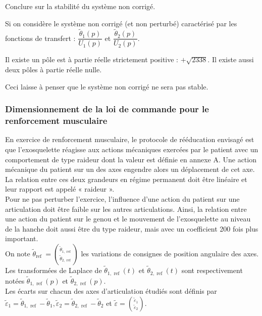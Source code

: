\begin{question}
\label{2023_ccs_psi_q_24}
Conclure sur la stabilité du système non corrigé.
\end{question}
\ifprof
\begin{corrige}

Si on considère le système non corrigé (et non perturbé) caractérisé par les fonctions de transfert : $\dfrac{\tilde{\theta}_1(p)}{U_1(p)}$ et $\dfrac{\tilde{\theta}_2(p)}{U_2(p)}$.

Il existe un pôle est à partie réelle strictement positive : $+\sqrt{2338}$. Il existe aussi deux pôles à partie réelle nulle.

Ceci laisse à penser que le système non corrigé ne sera pas stable.
\end{corrige}
\else
\fi


\subsubsection{Dimensionnement de la loi de commande pour le renforcement musculaire}

\ifprof
\else
En exercice de renforcement musculaire, le protocole de rééducation envisagé est que l'exosquelette réagisse aux actions mécaniques exercées par le patient avec un comportement de type raideur dont la valeur est définie en annexe A. Une action mécanique du patient sur un des axes engendre alors un déplacement de cet axe. La relation entre ces deux grandeurs en régime permanent doit être linéaire et leur rapport est appelé « raideur ».\\
Pour ne pas perturber l'exercice, l'influence d'une action du patient sur une articulation doit être faible sur les autres articulations. Ainsi, la relation entre une action du patient sur le genou et le mouvement de l'exosquelette au niveau de la hanche doit aussi être du type raideur, mais avec un coefficient 200 fois plus important.\\
On note $\tilde{\theta}_{\text {ref }}=\binom{\tilde{\theta}_{1, \text { ref }}}{\tilde{\theta}_{2, \text { ref }}}$ les variations de consignes de position angulaire des axes. Les transformées de Laplace de $\tilde{\theta}_{1, \text { ref }}(t)$ et $\tilde{\theta}_{2, \text { ref }}(t)$ sont respectivement notées $\tilde{\theta}_{1, \text { ref }}(p)$ et $\tilde{\theta}_{2, \text { ref }}(p)$.\\
Les écarts sur chacun des axes d'articulation étudiés sont définis par $\tilde{\varepsilon}_{1}=\tilde{\theta}_{1, \text { ref }}-\tilde{\theta}_{1}, \tilde{\varepsilon}_{2}=\tilde{\theta}_{2, \text { ref }}-\tilde{\theta}_{2}$ et $\tilde{\varepsilon}=\binom{\tilde{\varepsilon}_{1}}{\tilde{\varepsilon}_{2}}$.\\
\fi



